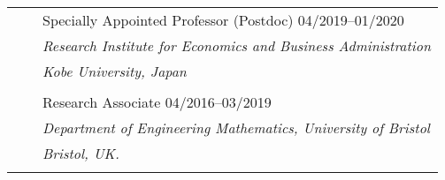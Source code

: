 \documentclass[letterpaper, 11pt]{article}
\begin{document}
\begin{longtable}{p{1.3in}p{2em}p{5.5in}}
                                                    & &\hspace{-3em} Specially Appointed Professor (Postdoc) \hfill 04/2019--01/2020\\
                                                    & &\hspace{-3em} \textit{Research Institute for Economics and Business Administration}\\
                                                    & &\hspace{-3em} \textit{Kobe University, Japan} \\
                                                    & &                                                                                                                                                                                                                          \\

                                                    & &\hspace{-3em} Research Associate \hfill 04/2016--03/2019 \\
                                                    & &\hspace{-3em} \textit{Department of Engineering Mathematics, University of Bristol} \\
                                                    & &\hspace{-3em} \textit{Bristol, UK.}\\
                                                    & &                                                                                                                                                                                                                          \\


\end{longtable}
\end{document}
